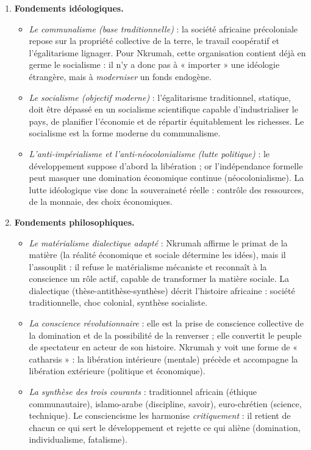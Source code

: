 \documentclass[11pt]{article}
\begin{document}
\begin{corrige}
\begin{enumerate}
\item \textbf{Fondements idéologiques.}
\begin{itemize}
\item \emph{Le communalisme (base traditionnelle)} : la société africaine précoloniale repose sur la propriété collective de la terre, le travail coopératif et l'égalitarisme lignager. Pour Nkrumah, cette organisation contient déjà en germe le socialisme : il n'y a donc pas à « importer » une idéologie étrangère, mais à \emph{moderniser} un fonds endogène.
\item \emph{Le socialisme (objectif moderne)} : l'égalitarisme traditionnel, statique, doit être dépassé en un socialisme scientifique capable d'industrialiser le pays, de planifier l'économie et de répartir équitablement les richesses. Le socialisme est la forme moderne du communalisme.
\item \emph{L'anti-impérialisme et l'anti-néocolonialisme (lutte politique)} : le développement suppose d'abord la libération ; or l'indépendance formelle peut masquer une domination économique continue (néocolonialisme). La lutte idéologique vise donc la souveraineté réelle : contrôle des ressources, de la monnaie, des choix économiques.
\end{itemize}
\item \textbf{Fondements philosophiques.}
\begin{itemize}
\item \emph{Le matérialisme dialectique adapté} : Nkrumah affirme le primat de la matière (la réalité économique et sociale détermine les idées), mais il l'assouplit : il refuse le matérialisme mécaniste et reconnaît à la conscience un rôle actif, capable de transformer la matière sociale. La dialectique (thèse-antithèse-synthèse) décrit l'histoire africaine : société traditionnelle, choc colonial, synthèse socialiste.
\item \emph{La conscience révolutionnaire} : elle est la prise de conscience collective de la domination et de la possibilité de la renverser ; elle convertit le peuple de spectateur en acteur de son histoire. Nkrumah y voit une forme de « catharsis » : la libération intérieure (mentale) précède et accompagne la libération extérieure (politique et économique).
\item \emph{La synthèse des trois courants} : traditionnel africain (éthique communautaire), islamo-arabe (discipline, savoir), euro-chrétien (science, technique). Le consciencisme les harmonise \emph{critiquement} : il retient de chacun ce qui sert le développement et rejette ce qui aliène (domination, individualisme, fatalisme).

\end{itemize}
\end{enumerate}
\end{corrige}
\end{document}
